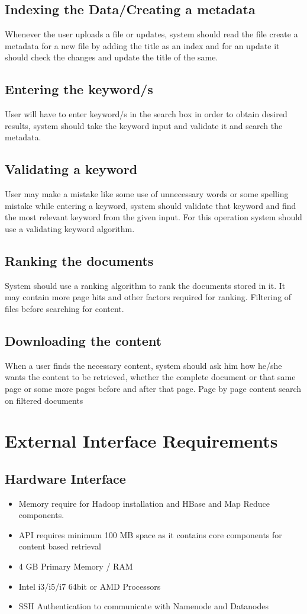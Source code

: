 \subsection{Indexing the Data/Creating a metadata}
Whenever the user uploads a file or updates, system should read the file create a metadata for a new file by adding the title as an index and for an update it should check the changes and update the title of the same.

\subsection{Entering the keyword/s}
User will have to enter keyword/s in the search box in order to obtain desired results, system should take the keyword input and validate it and search the metadata.

\subsection{Validating a keyword}
User may make a mistake like some use of unnecessary words or some spelling mistake while entering a keyword, system should validate that keyword and find the most relevant keyword from the given input. For this operation system should use a validating keyword algorithm.

\subsection{Ranking the documents}
System should use a ranking algorithm to rank the documents stored in it. It may contain more page hits and other factors required for ranking.
Filtering of files before searching for content.

\subsection{Downloading the content}
When a user finds the necessary content, system should ask him how he/she wants the content to be retrieved, whether the complete document or that same page or some more pages before and after that page.
Page by page content search on filtered documents

\section{External Interface Requirements}
\subsection{Hardware Interface}
\begin{itemize}	
\item Memory require for Hadoop installation and HBase and Map Reduce components.
\item API requires minimum 100 MB space as it contains core components for content based retrieval
\item 4 GB Primary Memory / RAM
\item Intel i3/i5/i7 64bit or AMD Processors
\item SSH Authentication to communicate with Namenode and Datanodes
\end{itemize}

